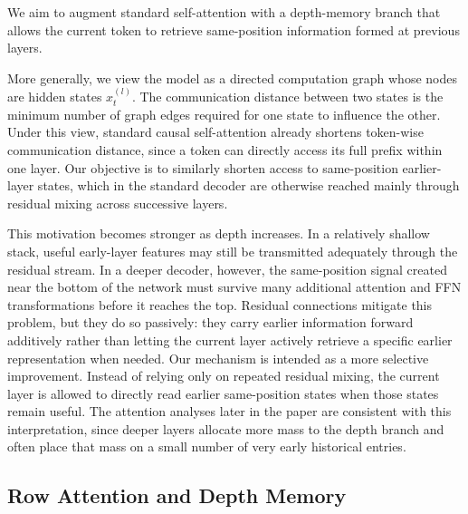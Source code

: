 \documentclass[11pt]{article}
\begin{document}
We aim to augment standard self-attention with a depth-memory branch that allows the current token to retrieve same-position information formed at previous layers.

More generally, we view the model as a directed computation graph whose nodes are hidden states $x_t^{(l)}$. The communication distance between two states is the minimum number of graph edges required for one state to influence the other. Under this view, standard causal self-attention already shortens token-wise communication distance, since a token can directly access its full prefix within one layer. Our objective is to similarly shorten access to same-position earlier-layer states, which in the standard decoder are otherwise reached mainly through residual mixing across successive layers.

This motivation becomes stronger as depth increases. In a relatively shallow stack, useful early-layer features may still be transmitted adequately through the residual stream. In a deeper decoder, however, the same-position signal created near the bottom of the network must survive many additional attention and FFN transformations before it reaches the top. Residual connections mitigate this problem, but they do so passively: they carry earlier information forward additively rather than letting the current layer actively retrieve a specific earlier representation when needed. Our mechanism is intended as a more selective improvement. Instead of relying only on repeated residual mixing, the current layer is allowed to directly read earlier same-position states when those states remain useful. The attention analyses later in the paper are consistent with this interpretation, since deeper layers allocate more mass to the depth branch and often place that mass on a small number of very early historical entries.

\subsection{Row Attention and Depth Memory}
\end{document}
